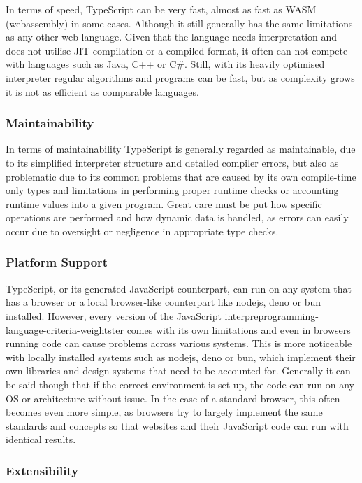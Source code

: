 In terms of speed, TypeScript can be very fast, almost as fast as WASM (\Gls{webassembly}) in some cases. Although it still generally has the same limitations as any other web language. Given that the language needs interpretation and does not utilise JIT compilation or a compiled format, it often can not compete with languages such as Java, C++ or C\#. Still, with its heavily optimised interpreter regular algorithms and programs can be fast, but as complexity grows it is not as efficient as comparable languages.

\subsubsection{Maintainability}

In terms of maintainability TypeScript is generally regarded as maintainable, due to its simplified interpreter structure and detailed compiler errors, but also as problematic due to its common problems that are caused by its own compile-time only types and limitations in performing proper runtime checks or accounting runtime values into a given program. Great care must be put how specific operations are performed and how dynamic data is handled, as errors can easily occur due to oversight or negligence in appropriate type checks.

\subsubsection{Platform Support}

TypeScript, or its generated JavaScript counterpart, can run on any system that has a browser or a local browser-like counterpart like \Gls{nodejs}, \Gls{deno} or \Gls{bun} installed. However, every version of the JavaScript interpreprogramming-language-criteria-weightster comes with its own limitations and even in browsers running code can cause problems across various systems. This is more noticeable with locally installed systems such as \Gls{nodejs}, \Gls{deno} or \Gls{bun}, which implement their own libraries and design systems that need to be accounted for. Generally it can be said though that if the correct environment is set up, the code can run on any OS or architecture without issue. In the case of a standard browser, this often becomes even more simple, as browsers try to largely implement the same standards and concepts so that websites and their JavaScript code can run with identical results.

\subsubsection{Extensibility}

